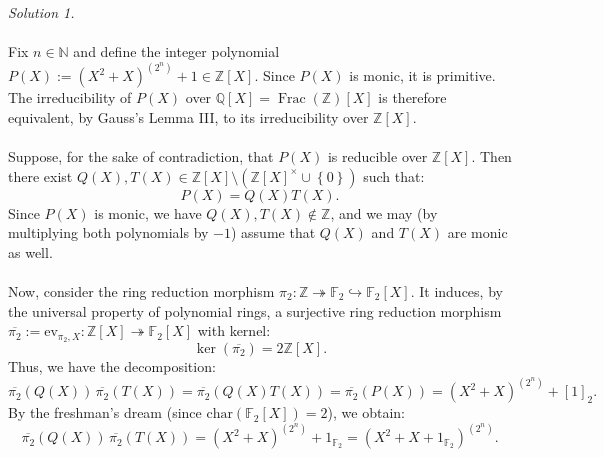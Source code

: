 \begin{solution}
    \textit{Solution 1.}
    \\\\
    Fix \( n \in \mathbb{N} \) and define the integer polynomial \( P\left(X\right) := \left( X^2 + X \right)^{\left(2^{n}\right)} + 1 \in \mathbb{Z}\left[X\right] \). Since \( P\left(X\right) \) is monic, it is primitive. The irreducibility of \( P\left(X\right) \) over \( \mathbb{Q}\left[X\right] = \operatorname{Frac}\left( \mathbb{Z} \right)\left[X\right] \) is therefore equivalent, by Gauss's Lemma III, to its irreducibility over \( \mathbb{Z}\left[X\right] \).
    \\\\
    Suppose, for the sake of contradiction, that \( P\left(X\right) \) is reducible over \( \mathbb{Z}\left[X\right] \). Then there exist \( Q\left(X\right), T\left(X\right) \in \mathbb{Z}\left[X\right]\setminus\left(\mathbb{Z}\left[X\right]^{\times}\cup \left\{0\right\}\right) \) such that:
    \[
        P\left(X\right) = Q\left(X\right)T\left(X\right).
    \]
    Since \( P\left(X\right) \) is monic, we have \( Q\left(X\right), T\left(X\right) \notin \mathbb{Z} \), and we may (by multiplying both polynomials by \( -1 \)) assume that \( Q\left(X\right) \) and \( T\left(X\right) \) are monic as well.
    \\\\
    Now, consider the ring reduction morphism \( \pi_2 : \mathbb{Z} \twoheadrightarrow \mathbb{F}_2 \hookrightarrow \mathbb{F}_2\left[X\right] \). It induces, by the universal property of polynomial rings, a surjective ring reduction morphism \( \overline{\pi_2} := \mathrm{ev}_{\pi_2, X} : \mathbb{Z}\left[X\right] \twoheadrightarrow \mathbb{F}_2\left[X\right] \) with kernel:
    \begin{equation}
        \label{4.1} \tag{1} \ker \left( \overline{\pi_2} \right) = 2\mathbb{Z}\left[X\right].
    \end{equation}
    Thus, we have the decomposition:
    \[
        \overline{\pi_2}\left(Q\left(X\right)\right) \, \overline{\pi_2}\left(T\left(X\right)\right) = \overline{\pi_2}\left(Q\left(X\right)T\left(X\right)\right) = \overline{\pi_2}\left(P\left(X\right)\right) = \left( X^2 + X \right)^{\left(2^n\right)} + \left[1\right]_2.
    \]
    By the freshman's dream (since \( \mathrm{char}\left(\mathbb{F}_2\left[X\right]\right) = 2 \)), we obtain:
    \[
        \overline{\pi_2}\left(Q\left(X\right)\right) \, \overline{\pi_2}\left(T\left(X\right)\right) = \left( X^2 + X \right)^{\left(2^n\right)} + 1_{\mathbb{F}_2} = \left( X^2 + X + 1_{\mathbb{F}_2} \right)^{\left(2^n\right)}.
\]
\end{solution}
